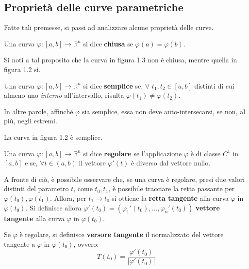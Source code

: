 \subsection{Proprietà delle curve parametriche}
Fatte tali premesse, si passi ad analizzare alcune proprietà delle curve.
\begin{definition}
    Una curva $\varphi:[a,b]\to\mathbb{R}^n$ si dice \textbf{chiusa} se $\varphi(a)=\varphi(b)$.
\end{definition}
\begin{oss}
    Si noti a tal proposito che la curva in figura 1.3 non è chiusa, mentre quella in figura 1.2 sì.
\end{oss}
\begin{definition}
    Una curva $\varphi:[a,b] \to \mathbb{R}^n$ si dice \textbf{semplice} se, $\forall$ $ t_1, t_2 \in [a,b]$ distinti di cui almeno uno \textit{interno} all'intervallo, risulta $\varphi(t_1)\neq\varphi(t_2)$.
\end{definition}
    \begin{oss}
        In altre parole, affinché $\varphi$ sia semplice, essa non deve auto-intersecarsi, se non, al più, negli estremi.
    \end{oss}
    \begin{oss}
        La curva in figura 1.2 è semplice.
    \end{oss}
\begin{definition}
    Una curva $\varphi:[a,b] \to \mathbb{R}^n$ si dice \textbf{regolare} se l'applicazione $\varphi$ è di classe $C^1$ in $[a,b]$ e se, $\forall t \in (a,b)$ il vettore $\varphi'(t)$ è diverso dal vettore nullo.
\end{definition}
A fronte di ciò, è possibile osservare che, se una curva è regolare, presi due valori distinti del parametro $t$, come $t_0, t_1$, è possibile tracciare la retta passante per $\varphi(t_0), \varphi(t_1)$. Allora, per $t_1 \to t_0$ si ottiene la \textbf{retta tangente} alla curva $\varphi$ in $\varphi(t_0)$.
Si definisce allora $\varphi'(t_0)=(\varphi_1'(t_0), \dots, \varphi_n'(t_0))$ \textbf{vettore tangente} alla curva $\varphi$ in $\varphi(t_0)$.
\begin{definition}
    Se $\varphi$ è regolare, si definisce \textbf{versore tangente} il normalizzato del vettore tangente a $\varphi$ in $\varphi(t_0)$, ovvero:
    \begin{equation*}
        T(t_0)=\frac{\varphi'(t_0)}{|\varphi'(t_0)|}
    \end{equation*}
\end{definition}
